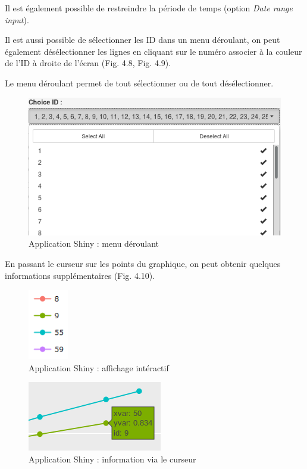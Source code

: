 \documentclass[]{report}
\begin{document}
Il est également possible de restreindre la période de temps (option
\emph{Date range input}).

Il est aussi possible de sélectionner les ID dans un menu déroulant, on
peut également désélectionner les lignes en cliquant sur le numéro
associer à la couleur de l'ID à droite de l'écran (Fig. 4.8, Fig. 4.9).

Le menu déroulant permet de tout sélectionner ou de tout désélectionner.

\begin{figure}[h!]
\includegraphics[]{../image/menu-deroulant.PNG}
\caption{Application Shiny : menu déroulant}
\end{figure}

En passant le curseur sur les points du graphique, on peut obtenir
quelques informations supplémentaires (Fig. 4.10).

\begin{figure}[h!]
\includegraphics[]{../image/shiny-selection.PNG}
\caption{Application Shiny : affichage intéractif}
\end{figure}

\begin{figure}[h!]
\includegraphics[]{../image/info-curseur.PNG}
\caption{Application Shiny : information via le curseur}
\end{figure}
\end{document}
